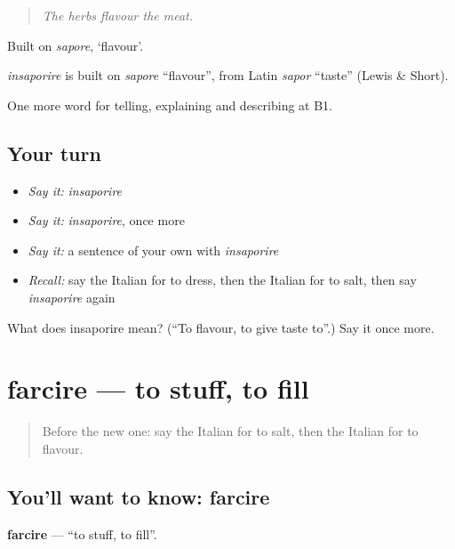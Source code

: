 \begin{quote}
\emph{The herbs flavour the meat.}
\end{quote}

Built on \emph{sapore}, ‘flavour’.

\begin{cousinweb}
\emph{insaporire} is built on \emph{sapore} \textquotedblleft{}flavour\textquotedblright{}, from Latin \emph{sapor} \textquotedblleft{}taste\textquotedblright{} (Lewis \& Short).
\end{cousinweb}

\begin{grammarlens}[title={What you've built}]
One more word for telling, explaining and describing at B1.
\end{grammarlens}

\subsection*{Your turn}
\begin{itemize}
\raggedright
  \item \emph{Say it:} \emph{insaporire}
  \item \emph{Say it:} \emph{insaporire}, once more
  \item \emph{Say it:} a sentence of your own with \emph{insaporire}
  \item \emph{Recall:} say the Italian for to dress, then the Italian for to salt, then say \emph{insaporire} again
\end{itemize}

\begin{tcolorbox}[breakable,colback=teal!4,colframe=teal!35!black,title={Before you move on}]
What does insaporire mean? (\textquotedblleft{}To flavour, to give taste to\textquotedblright{}.) Say it once more.
\end{tcolorbox}
\section[farcire]{farcire — to stuff, to fill}

\label{lesson:IT-C337-farcire}



\begin{quote}
Before the new one: say the Italian for to salt, then the Italian for to flavour.
\end{quote}

\subsection*{You'll want to know: farcire}
\textbf{farcire} — \textquotedblleft{}to stuff, to fill\textquotedblright{}.

